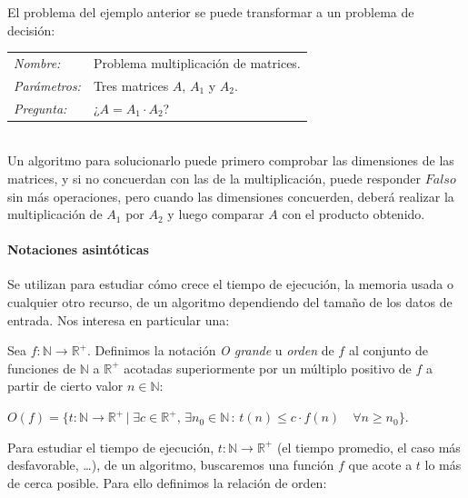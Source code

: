 \begin{example}
	El problema del ejemplo anterior se puede transformar a un problema de decisión:
	
	\begin{tabular}{|ll}
		\textit{Nombre:} & Problema multiplicación de matrices. \\
		\textit{Parámetros:} & Tres matrices $A$, $A_1$ y $A_2$. \\
		\textit{Pregunta:} & ¿$ A = A_1 \cdot A_2$? \\
	\end{tabular}
	\\
	
	Un algoritmo para solucionarlo puede primero comprobar las dimensiones de las matrices, y si no concuerdan con las de la multiplicación, puede responder $Falso$ sin más operaciones, pero cuando las dimensiones concuerden, deberá realizar la multiplicación de $A_1$ por $A_2$ y luego comparar $A$ con el producto obtenido.
	
\end{example}

\hfil

\paragraph{Notaciones asintóticas} 

\hfil

Se utilizan para estudiar cómo crece el tiempo de ejecución, la memoria usada o cualquier otro recurso, de un algoritmo dependiendo del tamaño de los datos de entrada. Nos interesa en particular una:

\begin{definition}
	Sea $f : \mathbb{N} \rightarrow \mathbb{R}^+$. Definimos la notación \textit{O grande} u \textit{orden} de $f$ al conjunto de funciones de $\mathbb{N}$ a $\mathbb{R}^+$ acotadas superiormente por un múltiplo positivo de $f$ a partir de cierto valor $n \in \mathbb{N}$:
		
		$O(f) = \{t:\mathbb{N} \rightarrow \mathbb{R}^+ \, | \; \exists c \in \mathbb{R}^+,\, \exists 
		n_0\in \mathbb{N} \, : \, t(n) \leq c\cdot f(n) \quad \forall n \geq n_0  \}$. 

\end{definition}

\hfil

Para estudiar el tiempo de ejecución, $t : \mathbb{N} \rightarrow \mathbb{R}^+$ (el tiempo promedio, el caso más desfavorable, \dots), de un algoritmo, buscaremos una función $f$ que acote a $t$ lo más de cerca posible. Para ello definimos la relación de orden:

